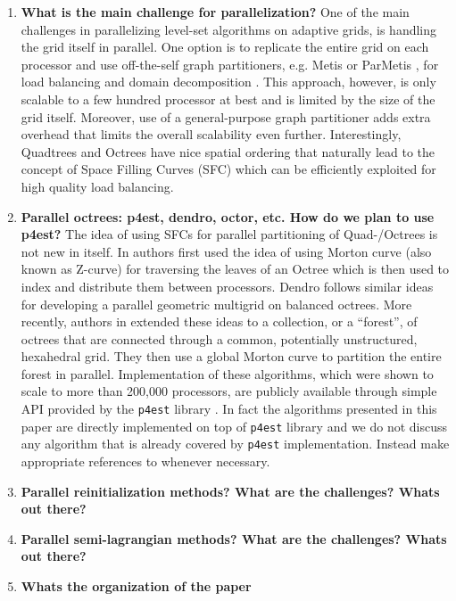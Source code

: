\begin{enumerate}
\item \textbf{What is the main challenge for parallelization?}
One of the main challenges in parallelizing level-set algorithms on adaptive grids, is handling the grid itself in parallel. One option is to replicate the entire grid on each processor and use off-the-self graph partitioners, e.g. Metis or ParMetis , for load balancing and domain decomposition . This approach, however, is only scalable to a few hundred processor at best and is limited by the size of the grid itself. Moreover, use of a general-purpose graph partitioner adds extra overhead that limits the overall scalability even further. Interestingly, Quadtrees and Octrees have nice spatial ordering that naturally lead to the concept of Space Filling Curves (SFC)  which can be efficiently exploited for high quality load balancing.

\item \textbf{Parallel octrees: p4est, dendro, octor, etc. How do we plan to use p4est?}
The idea of using SFCs for parallel partitioning of Quad-/Octrees is not new in itself. In  authors first used the idea of using Morton curve (also known as Z-curve) for traversing the leaves of an Octree which is then used to index and distribute them between processors. Dendro  follows similar ideas for developing a parallel geometric multigrid on balanced octrees. More recently, authors in  extended these ideas to a collection, or a ``forest'', of octrees that are connected through a common, potentially unstructured, hexahedral grid. They then use a global Morton curve to partition the entire forest in parallel. Implementation of these algorithms, which were shown to scale to more than 200,000 processors, are publicly available through simple API provided by the \texttt{p4est} library . In fact the algorithms presented in this paper are directly implemented on top of \texttt{p4est} library and we do not discuss any algorithm that is already covered by \texttt{p4est} implementation. Instead make appropriate references to  whenever necessary.

\item \textbf{Parallel reinitialization methods? What are the challenges? Whats out there?}

\item \textbf{Parallel semi-lagrangian methods? What are the challenges? Whats out there?}

\item \textbf{Whats the organization of the paper}
\end{enumerate}